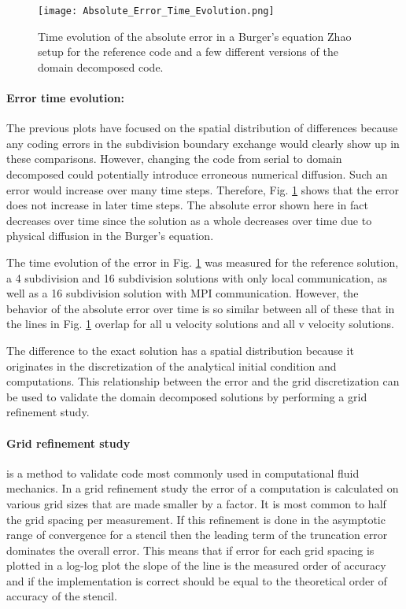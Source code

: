 \begin{figure}[!htbp]
\centering
\texttt{[image: Absolute\_Error\_Time\_Evolution.png]}
\caption{Time evolution of the absolute error in a Burger's equation Zhao setup for the reference code and a few different versions of the domain decomposed code.}
\label{fig:burgers_time_evolution}
\end{figure}

\paragraph{Error time evolution:}
The previous plots have focused on the spatial distribution of differences because any coding errors in the subdivision boundary exchange would clearly show up in these comparisons.
However, changing the code from serial to domain decomposed could potentially introduce erroneous numerical diffusion.
Such an error would increase over many time steps.
Therefore, Fig. \ref{fig:burgers_time_evolution} shows that the error does not increase in later time steps.
The absolute error shown here in fact decreases over time since the solution as a whole decreases over time due to physical diffusion in the Burger's equation.

The time evolution of the error in Fig. \ref{fig:burgers_time_evolution} was measured for the reference solution, a 4 subdivision and 16 subdivision solutions with only local communication, as well as a 16 subdivision solution with MPI communication.
However, the behavior of the absolute error over time is so similar between all of these that in the lines in Fig. \ref{fig:burgers_time_evolution} overlap for all u velocity solutions and all v velocity solutions.

The difference to the exact solution has a spatial distribution because it originates in the discretization of the analytical initial condition and computations.
This relationship between the error and the grid discretization can be used to validate the domain decomposed solutions by performing a grid refinement study.

\paragraph{Grid refinement study} is a method to validate code most commonly used in computational fluid mechanics.
In a grid refinement study the error of a computation is calculated on various grid sizes that are made smaller by a factor.
It is most common to half the grid spacing per measurement.
If this refinement is done in the asymptotic range of convergence for a stencil then the leading term of the truncation error dominates the overall error.
This means that if error for each grid spacing is plotted in a log-log plot the slope of the line is the measured order of accuracy and if the implementation is correct should be equal to the theoretical order of accuracy of the stencil.

